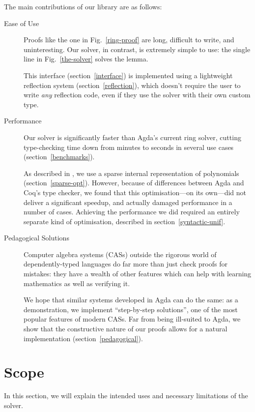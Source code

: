 \documentclass[acmsmall,anonymous]{acmart}\settopmatter{printfolios=true,printccs=false,printacmref=false}
\theoremstyle{remark}
\begin{document}
The main contributions of our library are as follows:
\begin{description}
  \item[Ease of Use] Proofs like the one in Fig.~\ref{ring-proof} are long,
    difficult to write, and uninteresting. Our solver, in contrast, is extremely
    simple to use: the single line in Fig.~\ref{the-solver} solves the lemma.

    This interface (section~\ref{interface}) is implemented using a lightweight
    reflection system (section~\ref{reflection}), which doesn't require the user
    to write \emph{any} reflection code, even if they use the solver with their
    own custom type. 
  \item[Performance] Our solver is significantly faster than Agda's current ring
    solver, cutting type-checking time down from minutes to seconds in several
    use cases (section~\ref{benchmarks}).

    As described in \citet{gregoire_proving_2005}, we use a sparse internal
    representation of polynomials (section~\ref{sparse-opt}). However, because
    of differences between Agda and Coq's type checker, we found that this
    optimisation---on its own---did not deliver a significant speedup, and
    actually damaged performance in a number of cases. Achieving the performance
    we did required an entirely separate kind of optimisation, described in
    section~\ref{syntactic-unif}.
  \item[Pedagogical Solutions] Computer algebra systems (CASs) outside the
    rigorous world of dependently-typed languages do far more than just check
    proofs for mistakes: they have a wealth of other features which can help
    with learning mathematics as well as verifying it.

    We hope that similar systems developed in Agda can do the same: as a
    demonstration, we implement ``step-by-step solutions'', one of the most
    popular features of modern CASs. Far from being ill-suited to Agda, we show
    that the constructive nature of our proofs allows for a natural
    implementation (section~\ref{pedagogical}).
\end{description}
\section{Scope}
In this section, we will explain the intended uses and necessary limitations of
the solver.
\end{document}
